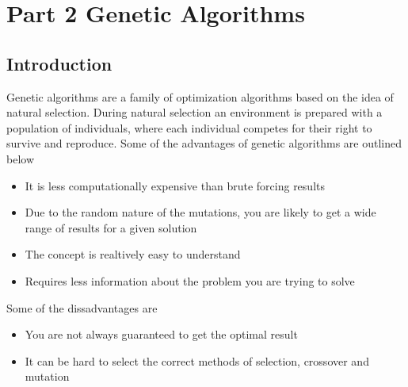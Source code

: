 \section{Part 2 Genetic Algorithms}

\subsection{Introduction}

Genetic algorithms are a family of optimization algorithms based on the idea of natural selection. During natural selection an environment is prepared with a population of individuals, where each individual competes for their right to survive and reproduce. Some of the advantages of genetic algorithms are outlined below

\begin{itemize}
  \item It is less computationally expensive than brute forcing results
  \item Due to the random nature of the mutations, you are likely to get a wide range of results for a given solution
  \item The concept is realtively easy to understand
  \item Requires less information about the problem you are trying to solve
\end{itemize}

Some of the dissadvantages are

\begin{itemize}
  \item You are not always guaranteed to get the optimal result
  \item It can be hard to select the correct methods of selection, crossover and mutation
\end{itemize}